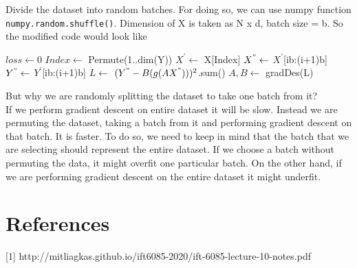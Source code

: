 \documentclass[12pt]{article}
\begin{document}
Divide the dataset into random batches. For doing so, we can use numpy function \lstinline{numpy.random.shuffle()}. Dimension of X is taken as N x d, batch size = b. So the modified code would look like
\begin{algorithmic}
\State $loss \gets 0$
\State $Index \gets $ Permute(1..dim(Y))
\State $X^{'} \gets $ X[Index]
\State $X^{"} \gets $ $X^{'}$[ib:(i+1)b]
\State $Y^{"} \gets $ $Y^{'}$[ib:(i+1)b]
\State $L \gets $ $(Y^{"} - B(g(AX^{"})))^{2}$.sum()
\State $A,B \gets$ gradDes(L)
\EndFor
\EndFor
\end{algorithmic}
But why we are randomly splitting the dataset to take one batch from it?\\ 
If we perform gradient descent on entire dataset it will be slow. Instead we are permuting the dataset, taking a batch from it and performing gradient descent on that batch. It is faster. To do so, we need to keep in mind that the batch that we are selecting should represent the entire dataset. If we choose a batch without permuting the data, it might overfit one particular batch. On the other hand, if we are performing gradient descent on the entire dataset it might underfit.


\section{References}
[1] http://mitliagkas.github.io/ift6085-2020/ift-6085-lecture-10-notes.pdf



%


\end{document}
